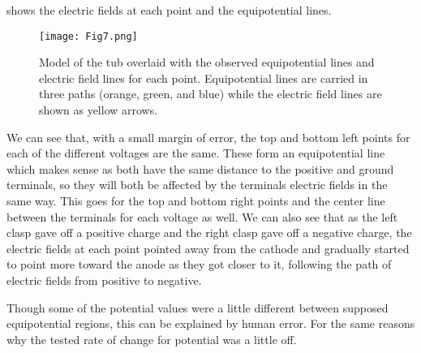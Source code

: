 ﻿\documentclass[10pt,journal,twoside]{IEEEtran}
\begin{document}
 shows the electric fields at each point and the equipotential lines. 
\begin{figure}
\begin{center}
\texttt{[image: Fig7.png]}
\end{center}
\caption{Model of the tub overlaid with the observed equipotential lines and electric field lines for each point. Equipotential lines are carried in three paths (orange, green, and blue) while the electric field lines are shown as yellow arrows.}
\label{fig:7}
\end{figure}

We can see that, with a small margin of error, the top and bottom left points for each of the different voltages are the same. These form an equipotential line which makes sense as both have the same distance to the positive and ground terminals, so they will both be affected by the terminals electric fields in the same way. This goes for the top and bottom right points and the center line between the terminals for each voltage as well. We can also see that as the left clasp gave off a positive charge and the right clasp gave off a negative charge, the electric fields at each point pointed away from the cathode and gradually started to point more toward the anode as they got closer to it, following the path of electric fields from positive to negative.

Though some of the potential values were a little different between supposed equipotential regions, this can be explained by human error. For the same reasons why the tested rate of change for potential was a little off.
\end{document}

